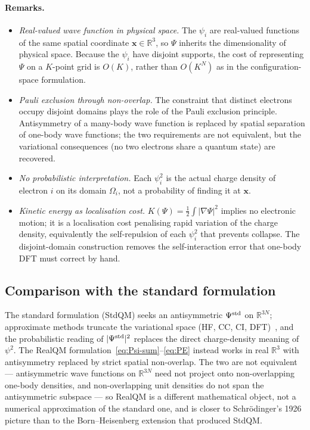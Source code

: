 \documentclass[11pt]{article}
\begin{document}
\paragraph{Remarks.}
\begin{itemize}\setlength{\itemsep}{2pt}
\item \emph{Real-valued wave function in physical space.} The $\psi_i$ are real-valued functions of the same spatial coordinate $\mathbf{x} \in \mathbb{R}^3$, so $\Psi$ inherits the dimensionality of physical space. Because the $\psi_i$ have disjoint supports, the cost of representing $\Psi$ on a $K$-point grid is $O(K)$, rather than $O(K^N)$ as in the configuration-space formulation.
\item \emph{Pauli exclusion through non-overlap.} The constraint that distinct electrons occupy disjoint domains plays the role of the Pauli exclusion principle. Antisymmetry of a many-body wave function is replaced by spatial separation of one-body wave functions; the two requirements are not equivalent, but the variational consequences (no two electrons share a quantum state) are recovered.
\item \emph{No probabilistic interpretation.} Each $\psi_i^2$ is the actual charge density of electron $i$ on its domain $\Omega_i$, not a probability of finding it at $\mathbf{x}$.
\item \emph{Kinetic energy as localisation cost.} $K(\Psi) = \tfrac{1}{2}\int |\nabla \Psi|^2$ implies no electronic motion; it is a localisation cost penalising rapid variation of the charge density, equivalently the self-repulsion of each $\psi_i^2$ that prevents collapse. The disjoint-domain construction removes the self-interaction error that one-body DFT must correct by hand.
\end{itemize}

\subsection{Comparison with the standard formulation}

The standard formulation (StdQM) seeks an antisymmetric $\Psi^{\rm std}$ on $\mathbb{R}^{3N}$; approximate methods truncate the variational space (HF, CC, CI, DFT)~\cite{KS65,MHG17}, and the probabilistic reading of $|\Psi^{\rm std}|^2$ replaces the direct charge-density meaning of $\psi^2$. The RealQM formulation~\eqref{eq:Psi-sum}--\eqref{eq:PE} instead works in real $\mathbb{R}^3$ with antisymmetry replaced by strict spatial non-overlap. The two are not equivalent --- antisymmetric wave functions on $\mathbb{R}^{3N}$ need not project onto non-overlapping one-body densities, and non-overlapping unit densities do not span the antisymmetric subspace --- so RealQM is a different mathematical object, not a numerical approximation of the standard one, and is closer to Schr\"odinger's 1926 picture than to the Born--Heisenberg extension that produced StdQM.
\end{document}
